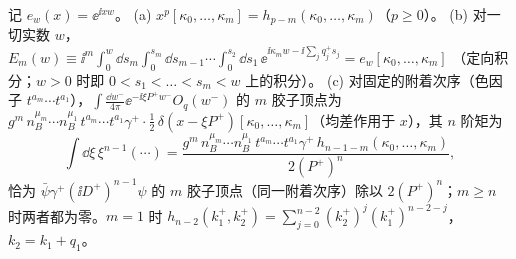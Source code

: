 \begin{lemma}[均差恒等式]\label{lem:appL-divided-differences}
记 $e_w(x)=\ee^{\ii xw}$。
(a) $x^p[\kappa_0,\dots,\kappa_m]=h_{p-m}(\kappa_0,\dots,\kappa_m)$（$p\ge0$）。
(b) 对一切实数 $w$，
$E_m(w)\equiv\ii^m\int_0^w\!\dd s_m\int_0^{s_m}\!\dd s_{m-1}\cdots\int_0^{s_2}\!\dd s_1\,\ee^{\ii\kappa_mw-\ii\sum_jq_j^+s_j}=e_w[\kappa_0,\dots,\kappa_m]$
（定向积分；$w>0$ 时即 $0<s_1<\dots<s_m<w$ 上的积分）。
(c) 对固定的附着次序（色因子 $t^{a_m}\cdots t^{a_1}$），$\int\frac{\dd w^-}{4\pi}\ee^{-\ii\xi P^+w^-}O_q(w^-)$ 的 $m$ 胶子顶点为 $g^m\,n_B^{\mu_m}\cdots n_B^{\mu_1}\,t^{a_m}\cdots t^{a_1}\gamma^+\cdot\frac12\,\delta(x-\xi P^+)[\kappa_0,\dots,\kappa_m]$（均差作用于 $x$），其 $n$ 阶矩为
\begin{equation}\label{eq:appL-vertex}
\int\dd\xi\,\xi^{n-1}(\cdots)=\frac{g^m\,n_B^{\mu_m}\cdots n_B^{\mu_1}\,t^{a_m}\cdots t^{a_1}\gamma^+\,h_{n-1-m}(\kappa_0,\dots,\kappa_m)}{2(P^+)^n},
\end{equation}
恰为 $\bar\psi\gamma^+(\ii D^+)^{n-1}\psi$ 的 $m$ 胶子顶点（同一附着次序）除以 $2(P^+)^n$；$m\ge n$ 时两者都为零。$m=1$ 时 $h_{n-2}(k_1^+,k_2^+)=\sum_{j=0}^{n-2}(k_2^+)^j(k_1^+)^{n-2-j}$，$k_2=k_1+q_1$。
\end{lemma}

